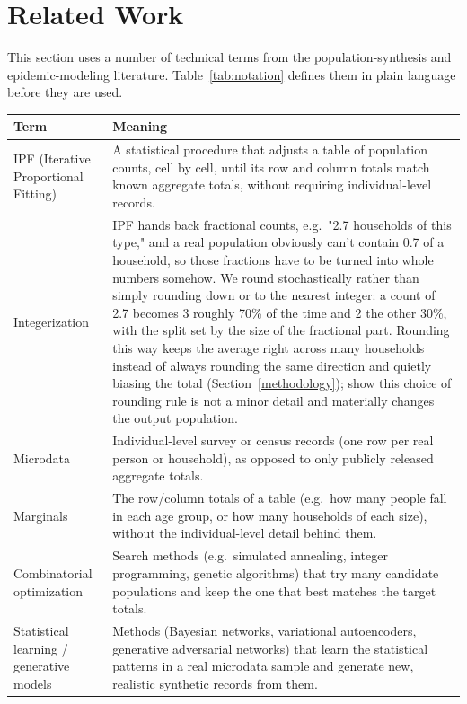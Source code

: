\documentclass{article}
\begin{document}
\section{Related Work}\label{related-work}

This section uses a number of technical terms from the population-synthesis and epidemic-modeling literature. Table~\ref{tab:notation} defines them in plain language before they are used.

\begin{table}[htbp]
\centering
\small
\setlength{\tabcolsep}{4pt}
\renewcommand{\arraystretch}{1.2}
\begin{tabularx}{\textwidth}{@{}l L@{}}
\toprule
Term & Meaning \\ \midrule
IPF (Iterative Proportional Fitting) & A statistical procedure that adjusts a table of population counts, cell by cell, until its row and column totals match known aggregate totals, without requiring individual-level records. \\
Integerization & IPF hands back fractional counts, e.g.\ "2.7 households of this type," and a real population obviously can't contain 0.7 of a household, so those fractions have to be turned into whole numbers somehow. We round stochastically rather than simply rounding down or to the nearest integer: a count of 2.7 becomes 3 roughly 70\% of the time and 2 the other 30\%, with the split set by the size of the fractional part. Rounding this way keeps the average right across many households instead of always rounding the same direction and quietly biasing the total (Section~\ref{methodology}); \citet{DURANHERAS201878} show this choice of rounding rule is not a minor detail and materially changes the output population. \\
Microdata & Individual-level survey or census records (one row per real person or household), as opposed to only publicly released aggregate totals. \\
Marginals & The row/column totals of a table (e.g.\ how many people fall in each age group, or how many households of each size), without the individual-level detail behind them. \\
Combinatorial optimization & Search methods (e.g.\ simulated annealing, integer programming, genetic algorithms) that try many candidate populations and keep the one that best matches the target totals. \\
Statistical learning / generative models & Methods (Bayesian networks, variational autoencoders, generative adversarial networks) that learn the statistical patterns in a real microdata sample and generate new, realistic synthetic records from them. \\

\end{tabularx}
\end{table}
\end{document}
